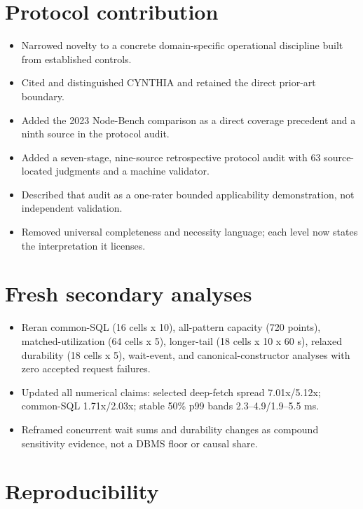 \documentclass[11pt,a4paper]{article}
\begin{document}
\section*{Protocol contribution}

\begin{itemize}
  \item Narrowed novelty to a concrete domain-specific operational discipline built from established controls.
  \item Cited and distinguished CYNTHIA and retained the direct prior-art boundary.
  \item Added the 2023 Node-Bench comparison as a direct coverage precedent and a ninth source in the protocol audit.
  \item Added a seven-stage, nine-source retrospective protocol audit with 63 source-located judgments and a machine validator.
  \item Described that audit as a one-rater bounded applicability demonstration, not independent validation.
  \item Removed universal completeness and necessity language; each level now states the interpretation it licenses.
\end{itemize}

\section*{Fresh secondary analyses}

\begin{itemize}
  \item Reran common-SQL (16 cells x 10), all-pattern capacity (720 points), matched-utilization (64 cells x 5), longer-tail (18 cells x 10 x 60 s), relaxed durability (18 cells x 5), wait-event, and canonical-constructor analyses with zero accepted request failures.
  \item Updated all numerical claims: selected deep-fetch spread 7.01x/5.12x; common-SQL 1.71x/2.03x; stable 50\% p99 bands 2.3--4.9/1.9--5.5 ms.
  \item Reframed concurrent wait sums and durability changes as compound sensitivity evidence, not a DBMS floor or causal share.
\end{itemize}

\section*{Reproducibility}
\end{document}
